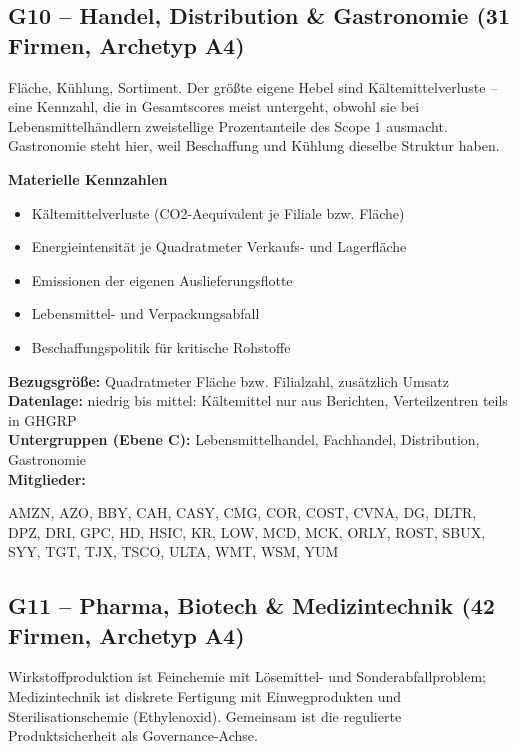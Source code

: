 \medskip
\subsection*{G10 -- Handel, Distribution \& Gastronomie \normalfont\small (31 Firmen, Archetyp A4)}
\noindent Fläche, Kühlung, Sortiment. Der größte eigene Hebel sind Kältemittelverluste -- eine Kennzahl, die in Gesamtscores meist untergeht, obwohl sie bei Lebensmittelhändlern zweistellige Prozentanteile des Scope 1 ausmacht. Gastronomie steht hier, weil Beschaffung und Kühlung dieselbe Struktur haben.

\noindent\textbf{Materielle Kennzahlen}
\begin{itemize}[nosep,leftmargin=1.2em]
  \item Kältemittelverluste (CO2-Aequivalent je Filiale bzw. Fläche)
  \item Energieintensität je Quadratmeter Verkaufs- und Lagerfläche
  \item Emissionen der eigenen Auslieferungsflotte
  \item Lebensmittel- und Verpackungsabfall
  \item Beschaffungspolitik für kritische Rohstoffe
\end{itemize}
\noindent\textbf{Bezugsgröße:} Quadratmeter Fläche bzw. Filialzahl, zusätzlich Umsatz\\
\textbf{Datenlage:} niedrig bis mittel: Kältemittel nur aus Berichten, Verteilzentren teils in GHGRP\\
\textbf{Untergruppen (Ebene C):} Lebensmittelhandel, Fachhandel, Distribution, Gastronomie\\
\textbf{Mitglieder:} {\raggedright\small\ttfamily AMZN, AZO, BBY, CAH, CASY, CMG, COR, COST, CVNA, DG, DLTR, DPZ, DRI, GPC, HD, HSIC, KR, LOW, MCD, MCK, ORLY, ROST, SBUX, SYY, TGT, TJX, TSCO, ULTA, WMT, WSM, YUM\par}

\medskip
\subsection*{G11 -- Pharma, Biotech \& Medizintechnik \normalfont\small (42 Firmen, Archetyp A4)}
\noindent Wirkstoffproduktion ist Feinchemie mit Lösemittel- und Sonderabfallproblem; Medizintechnik ist diskrete Fertigung mit Einwegprodukten und Sterilisationschemie (Ethylenoxid). Gemeinsam ist die regulierte Produktsicherheit als Governance-Achse.

